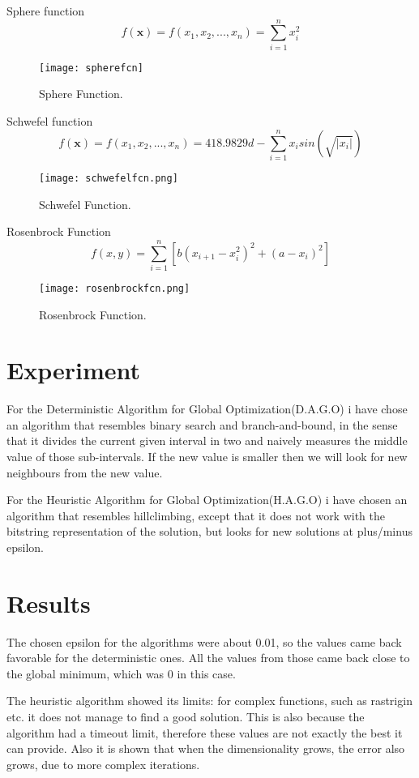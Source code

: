 \documentclass{article}
\begin{document}
\break

Sphere function
$$ f(\textbf{x}) = f(x_1, x_2, ..., x_n) = {\sum_{i=1}^{n} x_i^{2}} $$
\begin{figure}[!h]
  \centering
  \texttt{[image: spherefcn]}
  \caption{Sphere Function.}
\end{figure}

Schwefel function
$$ f(\textbf{x}) = f(x_1, x_2, ..., x_n) = 418.9829d -{\sum_{i=1}^{n} x_i sin(\sqrt{|x_i|})} $$
\begin{figure}[!h]
  \centering
  \texttt{[image: schwefelfcn.png]}
  \caption{Schwefel Function.}
\end{figure}

\break

Rosenbrock Function
$$ f(x, y)=\sum_{i=1}^{n}[b (x_{i+1} - x_i^2)^ 2 + (a - x_i)^2] $$
\begin{figure}[!h]
  \centering
  \texttt{[image: rosenbrockfcn.png]}
  \caption{Rosenbrock Function.}
\end{figure}

\section{Experiment}
For the Deterministic Algorithm for Global Optimization(D.A.G.O) i have chose an algorithm that resembles binary search and branch-and-bound\cite{binary}, in the sense that it divides the current given interval in two and naively measures the middle value of those sub-intervals. If the new value is smaller then we will look for new neighbours from the new value.

For the Heuristic Algorithm for Global Optimization(H.A.G.O) i have chosen an algorithm that resembles hillclimbing, except that it does not work with the bitstring representation of the solution, but looks for new solutions at plus/minus epsilon.

\section{Results}
The chosen epsilon for the algorithms were about 0.01, so the values came back favorable for the deterministic ones. All the values from those came back close to the global minimum, which was 0 in this case.

The heuristic algorithm showed its limits: for complex functions, such as rastrigin etc. it does not manage to find a good solution. This is also because the algorithm had a timeout limit, therefore these values are not exactly the best it can provide. Also it is shown that when the dimensionality grows, the error also grows, due to more complex iterations.
\end{document}
